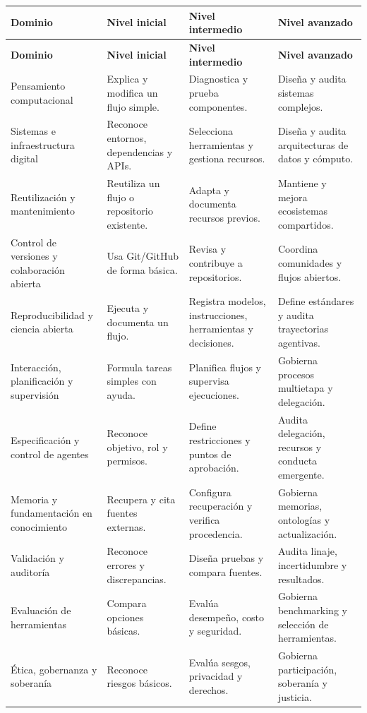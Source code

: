 \documentclass[11pt,a4paper]{article}
\begin{document}
\begin{longtable}{@{}p{3.4cm}p{3.5cm}p{3.5cm}p{3.5cm}@{}}
\toprule
\textbf{Dominio} & \textbf{Nivel inicial} & \textbf{Nivel intermedio} &
\textbf{Nivel avanzado}\\
\midrule
\endfirsthead
\toprule
\textbf{Dominio} & \textbf{Nivel inicial} & \textbf{Nivel intermedio} &
\textbf{Nivel avanzado}\\
\midrule
\endhead
Pensamiento computacional &
Explica y modifica un flujo simple. &
Diagnostica y prueba componentes. &
Diseña y audita sistemas complejos.\\
Sistemas e infraestructura digital &
Reconoce entornos, dependencias y APIs. &
Selecciona herramientas y gestiona recursos. &
Diseña y audita arquitecturas de datos y cómputo.\\
Reutilización y mantenimiento &
Reutiliza un flujo o repositorio existente. &
Adapta y documenta recursos previos. &
Mantiene y mejora ecosistemas compartidos.\\
Control de versiones y colaboración abierta &
Usa Git/GitHub de forma básica. &
Revisa y contribuye a repositorios. &
Coordina comunidades y flujos abiertos.\\
Reproducibilidad y ciencia abierta &
Ejecuta y documenta un flujo. &
Registra modelos, instrucciones, herramientas y decisiones. &
Define estándares y audita trayectorias agentivas.\\
Interacción, planificación y supervisión &
Formula tareas simples con ayuda. &
Planifica flujos y supervisa ejecuciones. &
Gobierna procesos multietapa y delegación.\\
Especificación y control de agentes &
Reconoce objetivo, rol y permisos. &
Define restricciones y puntos de aprobación. &
Audita delegación, recursos y conducta emergente.\\
Memoria y fundamentación en conocimiento &
Recupera y cita fuentes externas. &
Configura recuperación y verifica procedencia. &
Gobierna memorias, ontologías y actualización.\\
Validación y auditoría &
Reconoce errores y discrepancias. &
Diseña pruebas y compara fuentes. &
Audita linaje, incertidumbre y resultados.\\
Evaluación de herramientas &
Compara opciones básicas. &
Evalúa desempeño, costo y seguridad. &
Gobierna benchmarking y selección de herramientas.\\
Ética, gobernanza y soberanía &
Reconoce riesgos básicos. &
Evalúa sesgos, privacidad y derechos. &
Gobierna participación, soberanía y justicia.\\

\end{longtable}
\end{document}
